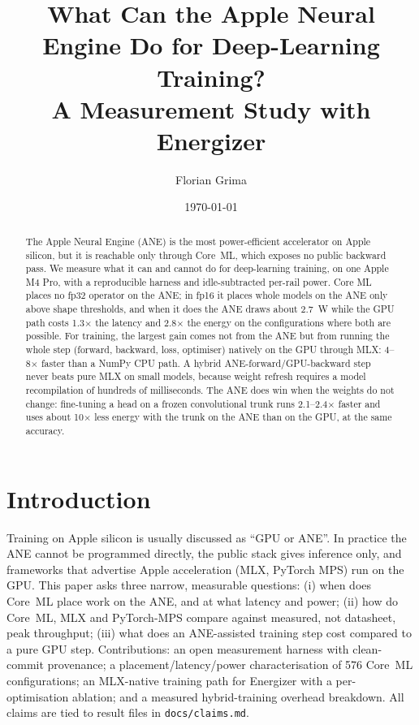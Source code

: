 \documentclass[11pt]{article}
\title{What Can the Apple Neural Engine Do for Deep-Learning Training?\\
\large A Measurement Study with Energizer}
\author{Florian Grima}
\date{\today}
\begin{document}
\maketitle
\begin{abstract}
The Apple Neural Engine (ANE) is the most power-efficient accelerator on Apple
silicon, but it is reachable only through Core~ML, which exposes no public
backward pass. We measure what it can and cannot do for deep-learning
training, on one Apple M4 Pro, with a reproducible harness and idle-subtracted
per-rail power. Core ML places no fp32 operator on the ANE; in fp16 it places
whole models on the ANE only above shape thresholds, and when it does the ANE
draws about 2.7~W while the GPU path costs 1.3$\times$ the latency and
2.8$\times$ the energy on the configurations where both are possible. For
training, the largest gain comes not from the ANE but from running the whole
step (forward, backward, loss, optimiser) natively on the GPU through MLX:
4--8$\times$ faster than a NumPy CPU path. A hybrid ANE-forward/GPU-backward
step never beats pure MLX on small models, because weight refresh requires a
model recompilation of hundreds of milliseconds. The ANE does win when the
weights do not change: fine-tuning a head on a frozen convolutional trunk runs
2.1--2.4$\times$ faster and uses about 10$\times$ less energy with the trunk on
the ANE than on the GPU, at the same accuracy.
\end{abstract}

\section{Introduction}
Training on Apple silicon is usually discussed as ``GPU or ANE''. In practice the
ANE cannot be programmed directly, the public stack gives inference only, and
frameworks that advertise Apple acceleration (MLX, PyTorch MPS) run on the GPU.
This paper asks three narrow, measurable questions: (i) when does Core~ML place
work on the ANE, and at what latency and power; (ii) how do Core~ML, MLX and
PyTorch-MPS compare against measured, not datasheet, peak throughput; (iii)
what does an ANE-assisted training step cost compared to a pure GPU step.
Contributions: an open measurement harness with clean-commit provenance; a
placement/latency/power characterisation of 576 Core~ML configurations; an
MLX-native training path for Energizer with a per-optimisation ablation; and a
measured hybrid-training overhead breakdown. All claims are tied to result
files in \texttt{docs/claims.md}.
\end{document}
